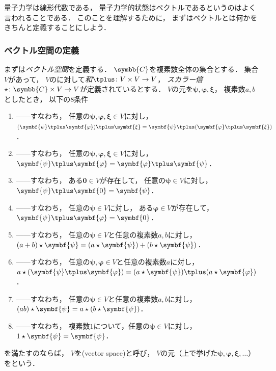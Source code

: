 \documentclass[
]{sotsu}
\newcommand{\bpsi}{\symbf{\psi}}
\newcommand{\bphi}{\symbf{\varphi}}
\newcommand{\bxi}{\symbf{\xi}}
\newcommand{\fire}[1]{\textcolor{fire}{#1}}
\newcommand{\water}[1]{\textcolor{water}{#1}}
\begin{document}
量子力学は線形代数である，
量子力学的状態はベクトルであるというのはよく言われることである．
このことを理解するために，
まずはベクトルとは何かをきちんと定義することにしよう．


\subsubsection{ベクトル空間の定義}
\label{sec:definition-of-vector-space}

まずは\emph{ベクトル空間}を定義する．
$\symbb{C}$を複素数全体の集合とする．
集合$V$があって，
$V$のに対して\emph{和}$\vecplus \colon V \times V \to V$，
\emph{スカラー倍}$\scaprod \colon \symbb{C} \times V \to V$が定義されているとする．
$V$の元を$\bpsi, \bphi, \bxi$，
複素数$a, b$としたとき，
以下の8条件
\begin{enumerate}
    \item \label{vector:sum-associative}
        ------すなわち，
        \fire{任意の$\bpsi, \bphi, \bxi \in V$}に対し，
        $(\bpsi \vecplus \bphi) \vecplus \bxi = \bpsi \vecplus (\bphi \vecplus \bxi)$．
    \item \label{vector:sum-commutative}
        ------すなわち，
        \fire{任意の$\bpsi, \bphi, \bxi \in V$}に対し，
        $\bpsi \vecplus \bphi = \bphi \vecplus \bpsi$．
    \item \label{vector:sum-zero}
        ------すなわち，
        \water{ある$\symbf{0} \in V$}が存在して，
        \fire{任意の$\bpsi \in V$}に対し，$\bpsi \vecplus \symbf{0} = \bpsi$．
    \item \label{vector:sum-opposite}
        ------すなわち，
        \fire{任意の$\bpsi \in V$}に対し，
        \water{ある$\bphi \in V$}が存在して，
        $\bpsi \vecplus \bphi = \symbf{0}$．
    \item \label{vector:scalar-sum}
        ------すなわち，
        \fire{任意の$\bpsi \in V$}と\fire{任意の複素数$a, b$}に対し，
        $(a + b) \scaprod \bpsi = (a \scaprod \bpsi) + (b \scaprod \bpsi)$．
    \item \label{vector:scalar-distributive}
        ------すなわち，
        \fire{任意の$\bpsi, \bphi \in V$}と\fire{任意の複素数$a$}に対し，
        $a \scaprod (\bpsi \vecplus \bphi) = (a \scaprod \bpsi) \vecplus (a \scaprod \bphi)$．
    \item \label{vector:scalar-prod}
        ------すなわち，
        \fire{任意の$\bpsi \in V$}と\fire{任意の複素数$a, b$}に対し，
        $(ab) \scaprod \bpsi = a \scaprod (b \scaprod \bpsi)$．
    \item \label{vector:scalar-identity}
        ------すなわち，
        複素数$1$について，\fire{任意の$\bpsi \in V$}に対し，
        $1 \scaprod \bpsi = \bpsi$．
\end{enumerate}
を満たすのならば，
$V$を(vector space)と呼び，
$V$の元（上で挙げた$\bpsi, \bphi, \bxi, \dotsc$）をという．
\end{document}
